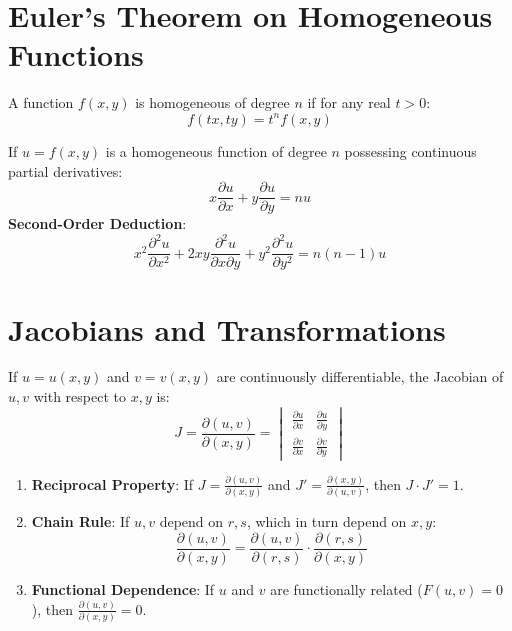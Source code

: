\section{Euler's Theorem on Homogeneous Functions}
\begin{definition}
A function $f(x,y)$ is homogeneous of degree $n$ if for any real $t > 0$:
\begin{equation}
f(tx, ty) = t^n f(x,y)
\end{equation}
\end{definition}

\begin{theorem}
If $u = f(x,y)$ is a homogeneous function of degree $n$ possessing continuous partial derivatives:
\begin{equation}
x \frac{\partial u}{\partial x} + y \frac{\partial u}{\partial y} = n u
\end{equation}
\textbf{Second-Order Deduction}:
\begin{equation}
x^2 \frac{\partial^2 u}{\partial x^2} + 2xy \frac{\partial^2 u}{\partial x \partial y} + y^2 \frac{\partial^2 u}{\partial y^2} = n(n - 1)u
\end{equation}
\end{theorem}

\section{Jacobians and Transformations}
\begin{definition}
If $u = u(x,y)$ and $v = v(x,y)$ are continuously differentiable, the Jacobian of $u, v$ with respect to $x, y$ is:
\begin{equation}
J = \frac{\partial(u,v)}{\partial(x,y)} = \begin{vmatrix}
\frac{\partial u}{\partial x} & \frac{\partial u}{\partial y} \\
\frac{\partial v}{\partial x} & \frac{\partial v}{\partial y}
\end{vmatrix}
\end{equation}
\end{definition}

\begin{theorem}
\begin{enumerate}
    \item \textbf{Reciprocal Property}: If $J = \frac{\partial(u,v)}{\partial(x,y)}$ and $J' = \frac{\partial(x,y)}{\partial(u,v)}$, then $J \cdot J' = 1$.
    \item \textbf{Chain Rule}: If $u, v$ depend on $r, s$, which in turn depend on $x, y$:
    \begin{equation}
    \frac{\partial(u,v)}{\partial(x,y)} = \frac{\partial(u,v)}{\partial(r,s)} \cdot \frac{\partial(r,s)}{\partial(x,y)}
    \end{equation}
    \item \textbf{Functional Dependence}: If $u$ and $v$ are functionally related ($F(u, v) = 0$), then $\frac{\partial(u,v)}{\partial(x,y)} = 0$.
\end{enumerate}
\end{theorem}

